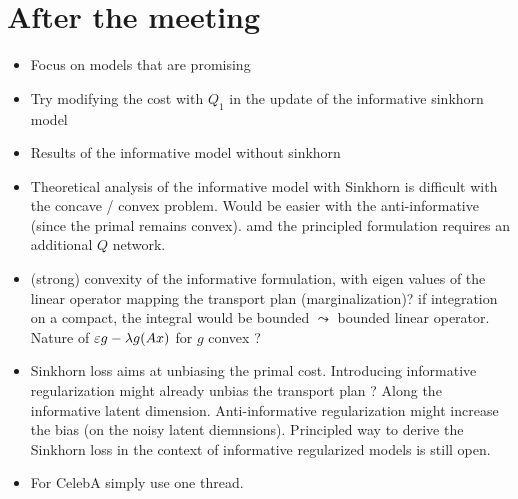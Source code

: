 \documentclass[11pt,a4paper]{article}
\begin{document}
\section*{After the meeting}
\begin{itemize}
    \item
        Focus on models that are promising
    \item
        Try modifying the cost with $Q_1$ in the update of the informative sinkhorn model
    \item
        Results of  the informative model without sinkhorn
    \item
        Theoretical analysis of the informative model with Sinkhorn is difficult with the concave / convex problem. Would be easier with the anti-informative (since the primal remains convex). amd the principled formulation requires an additional $Q$ network.
    \item
        (strong) convexity of the informative formulation, with eigen values of the linear operator mapping the transport plan (marginalization)? if integration on a compact, the integral would be bounded $\leadsto$ bounded linear operator. Nature of $\varepsilon g - \lambda g(Ax)$ for $g$ convex ?
    \item
        Sinkhorn loss aims at unbiasing the primal cost. Introducing informative regularization might already unbias the transport plan ? Along the informative latent dimension. Anti-informative regularization might increase the bias (on the noisy latent diemnsions). Principled way to derive the Sinkhorn loss in the context of informative regularized models is still open.
    \item
        For CelebA simply use one thread.
\end{itemize}

\printbibliography{}
\end{document}
